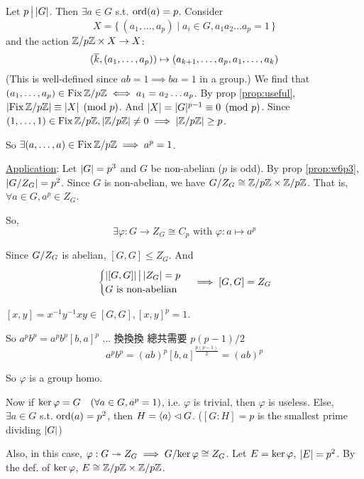 \begin{theorem}
  Let $p \Div \abs{G}$. Then $\exists a \in G$ s.t. $\ord(a) = p$. Consider
  \[ X = \{\, (a_1, \dots, a_p) \mid a_i \in G, a_1a_2\dots a_p = 1\,\} \]
  and the action $\quot{\Zb}{p\Zb} \times X \to X$:
  \[
    (\ob{k}, (a_1, \dots, a_p)) \mapsto (a_{k+1}, \dots, a_p, a_1, \dots, a_k)
  \]
  (This is well-defined since $ab = 1 \implies ba = 1$ in a group.)
  We find that $(a_1, \dots, a_p) \in \Fix \quot{\Zb}{p\Zb} \iff a_1 = a_2
  \dots a_p$.
  By prop \ref{prop:useful}, $\abs*{\Fix \quot{\Zb}{p\Zb}} \equiv \abs{X}
  \pmod p$. And $\abs{X} = \abs{G}^{p-1} \equiv 0 \pmod p$.
  Since $(1, \dots, 1) \in \Fix \quot{\Zb}{p\Zb}, \abs*{\quot{\Zb}{p\Zb}} \ne 0
  \implies \abs*{\quot{\Zb}{p\Zb}} \ge p$.

  So $\exists (a, \dots, a) \in \Fix \quot{\Zb}{p\Zb} \implies a^p = 1$.
\end{theorem}

\underline{Application}: Let $\abs{G} = p^3$ and $G$ be non-abelian
($p$ is odd).
By prop \ref{prop:w6p3}, $\abs*{\quot{G}{Z_G}} = p^2$. Since $G$ is non-abelian,
we have $\quot{G}{Z_G} \cong \quot{\Zb}{p\Zb} \times \quot{\Zb}{p\Zb}$.
That is, $\forall a \in G, a^p \in Z_G$.

So,
\[
  \exists \varphi: G \to Z_G \cong C_p \text{~with~}
  \varphi: a \mapsto a^p
\]

Since $\quot{G}{Z_G}$ is abelian, $[G,G] \le Z_G$. And
\[
  \begin{cases}
    \abs{[G,G]} \Div \abs{Z_G} = p \\
    G \text{~is non-abelian}
  \end{cases}
  \implies [G,G] = Z_G
\]

\begin{definition}
  $[x, y] = x^{-1}y^{-1}xy \in [G,G], [x,y]^p = 1$.
\end{definition}

So $a^p b^p = a^p b^p [b, a]^p$ ... 換換換 總共需要 $p(p-1)/2$
\[ a^p b^p = (ab)^p [b,a]^{\frac{p(p-1)}{2}} = (ab)^p \]

So $\varphi$ is a group homo.

Now if $\Ker \varphi = G \quad (\forall a \in G, a^p = 1)$,
i.e. $\varphi$ is trivial, then $\varphi$ is useless.
Else, $\exists a \in G$ s.t. $\ord(a) = p^2$, then
$H = \gen{a} \lhd G$. ($[G:H] = p$ is the smallest prime dividing $\abs{G}$)

Also, in this case, $\varphi: G \onto Z_G \implies
\quot{G}{\Ker \varphi} \cong Z_G$. Let $E = \Ker \varphi$, $\abs{E} = p^2$.
By the def. of $\Ker \varphi$, $E \cong \quot{\Zb}{p\Zb} \times
\quot{\Zb}{p\Zb}$.

